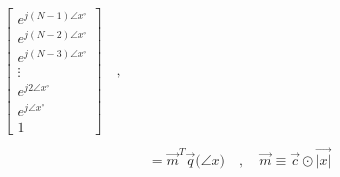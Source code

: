 \documentclass{article}
\begin{document}
\begin{align*}
\begin{bmatrix}
                                                        e^{j(N - 1)\angle{x}^{\circ}} \\
                                                        e^{j(N - 2)\angle{x}^{\circ}} \\
                                                        e^{j(N - 3)\angle{x}^{\circ}} \\
                                                        \vdots \\
                                                        e^{j2\angle{x}^{\circ}} \\
                                                        e^{j\angle{x}^{\circ}} \\
                                                        1
                                                    \end{bmatrix} \quad , \quad \\ \\
            &= \vec{m}^{T}\vec{q}\big(\angle{x}\big) \quad , \quad \vec{m} \equiv \vec{c} \odot \vec{|x|} 
\end{align*}
\end{document}
